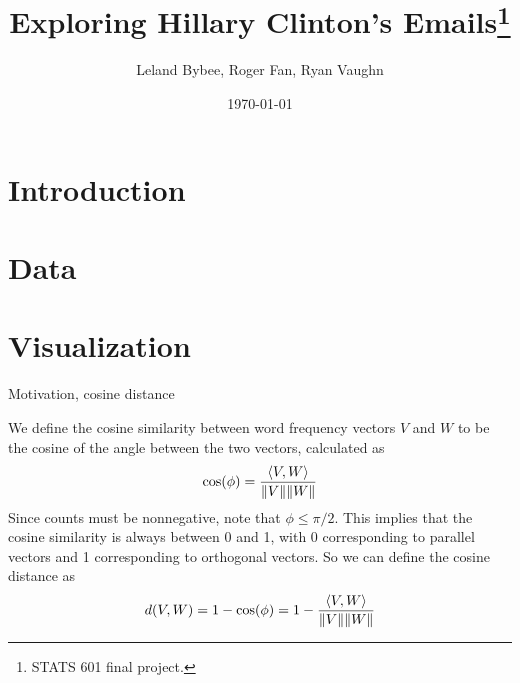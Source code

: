 \documentclass[12pt]{article}
\DeclarePairedDelimiter{\norm}{\lVert}{\rVert}
\theoremstyle{definition}
\theoremstyle{algodesc}
\begin{document}
\title{Exploring Hillary Clinton's Emails\thanks{STATS 601 final project.}}
\author{
    Leland Bybee, Roger Fan, Ryan Vaughn
}
\date{\today}

\maketitle


\section{Introduction}


\section{Data}


\section{Visualization}
Motivation, cosine distance

We define the cosine similarity between word frequency vectors $V$ and $W$ to be the cosine of the angle between the two vectors, calculated as
\begin{equation} \label{eq:cos_sim}
\cos(\phi) = \frac{\langle V, W \rangle}{\norm{V}\norm{W}}
\end{equation}
Since counts must be nonnegative, note that $\phi \leq \pi/2$. This implies that the cosine similarity is always between 0 and 1, with 0 corresponding to parallel vectors and 1 corresponding to orthogonal vectors. So we can define the cosine distance as
\begin{equation} \label{eq:cos_dist}
d(V, W) = 1 - \cos(\phi) = 1 - \frac{\langle V, W \rangle}{\norm{V}\norm{W}}
\end{equation}
\end{document}
